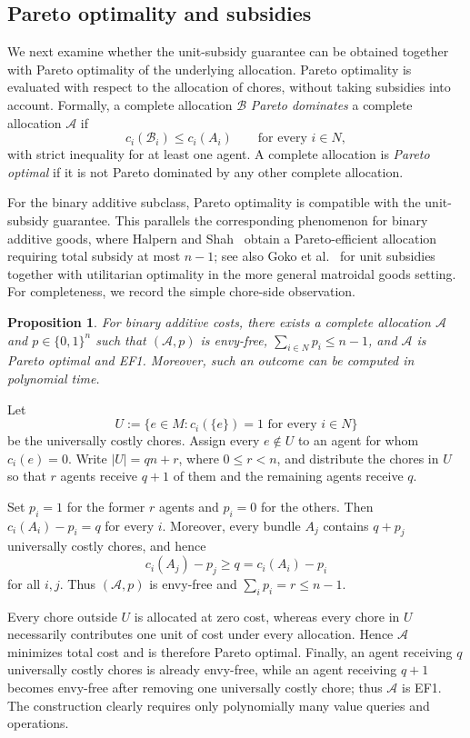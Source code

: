 \documentclass[11pt]{article}
\makeatletter
\theoremstyle{plain}
\newtheorem{proposition}{Proposition}
\theoremstyle{plain}
\renewenvironment{proof}[1][\proofname]{\par
  \pushQED{\qed}%
  \normalfont \topsep6\p@\@plus6\p@\relax
  \trivlist
  \item[\hskip\labelsep\bfseries #1\@addpunct{}]\ignorespaces
}{%
  \popQED\endtrivlist\@endpefalse
}
\newcommand{\agents}{N}                       %
\newcommand{\alloc}{\mathcal{A}}              %
\newcommand{\allocB}{\mathcal{B}}
\newcommand{\bundle}[1]{A_{#1}}
\newcommand{\cost}{c}
\makeatother
\begin{document}
\subsection{Pareto optimality and subsidies}
We next examine whether the unit-subsidy guarantee can be obtained together with Pareto optimality of the underlying allocation. Pareto optimality is evaluated with respect to the allocation of chores, without taking subsidies into account. Formally, a complete allocation $\allocB$ \emph{Pareto dominates} a complete allocation $\alloc$ if
\[\cost_i(\allocB_i)\leq \cost_i(\bundle i)
    \qquad\text{for every }i\in\agents,
\]
with strict inequality for at least one agent. A complete allocation is \emph{Pareto optimal} if it is not Pareto dominated by any other complete allocation.

For the binary additive subclass, Pareto optimality is compatible with the unit-subsidy guarantee. This parallels the corresponding phenomenon for binary additive goods, where Halpern and Shah~\cite{HS19} obtain a Pareto-efficient allocation requiring total subsidy at most $n-1$; see also Goko et al.~\cite{goko2024fair} for unit subsidies together with utilitarian optimality in the more general matroidal goods setting. For completeness, we record the simple chore-side observation.

\begin{proposition}
\label{prop:additive-po}
For binary additive costs, there exists a complete allocation $\mathcal A$ and $p\in\{0,1\}^n$ such that $(\mathcal A,p)$ is envy-free, $\sum_{i\in N}p_i\le n-1$, and $\mathcal A$ is Pareto optimal and EF1. Moreover, such an outcome can be computed in polynomial time.
\end{proposition}

\begin{proof}
Let
\[
U:=\{e\in M:c_i(\{e\})=1\text{ for every }i\in N\}
\]
be the universally costly chores. Assign every $e\notin U$ to an agent for whom $c_i(e)=0$. Write $|U|=qn+r$, where $0\le r<n$, and distribute the chores in $U$ so that $r$ agents receive $q+1$ of them and the remaining agents receive $q$.

Set $p_i=1$ for the former $r$ agents and $p_i=0$ for the others. Then $c_i(A_i)-p_i=q$ for every $i$. Moreover, every bundle $A_j$ contains $q+p_j$ universally costly chores, and hence
\[
c_i(A_j)-p_j\ge q=c_i(A_i)-p_i
\]
for all $i,j$. Thus $(\mathcal A,p)$ is envy-free and $\sum_i p_i=r\le n-1$.

Every chore outside $U$ is allocated at zero cost, whereas every chore in $U$ necessarily contributes one unit of cost under every allocation. Hence $\mathcal A$ minimizes total cost and is therefore Pareto optimal. Finally, an agent receiving $q$ universally costly chores is already envy-free, while an agent receiving $q+1$ becomes envy-free after
removing one universally costly chore; thus $\mathcal A$ is EF1. The construction clearly requires only polynomially many value queries
and operations.
\end{proof}
\end{document}
